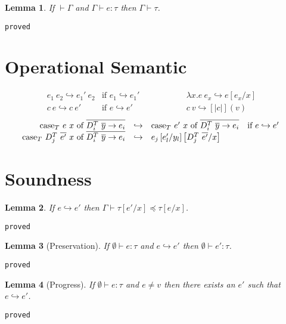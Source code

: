 \documentclass[10pt,a4paper]{article}
\newtheorem{lemma}{Lemma}
\newcommand\showproof[1]{\texttt{proved}}
\newcommand\dcti{\dct{i}}
\newcommand\dct[1]{\ensuremath{D^T_{#1}}}
\newcommand\efun[2]{\ensuremath{\lambda #1 . #2}}
\newcommand\eapp[2]{\ensuremath{#1 \ #2}}
\newcommand\edata[2]{\ensuremath{#1 \ #2}}
\newcommand\ecase[5]{\ensuremath{\text{case}_T\ #1\ #2\ \text{of}\ \overline{\edata{#3}{#4} \rightarrow #5}}}
\newcommand\sub[2]{\ensuremath{\left[ #2 / #1 \right]}}
\newcommand\eval[2]{\ensuremath{#1 \hookrightarrow #2}}
\newcommand\hastype[3]{\ensuremath{#1 \vdash #2 \colon #3}}
\newcommand\iswellformed[2]{\ensuremath{#1 \vdash #2}}
\newcommand\issubtype[3]{\ensuremath{#1 \vdash #2 \preceq #3}}
\begin{document}
\begin{lemma}\label{lemma:wellformed}
If \iswellformed{}{\Gamma} and \hastype{\Gamma}{e}{\tau} then \iswellformed{\Gamma}{\tau}.
\end{lemma}
\showproof{
	\begin{proof}
	
	\end{proof}
}

\section*{Operational Semantic}

$$
\begin{array}{lllll}
\eval{\eapp{e_1}{e_2}}{\eapp{e_1'}{e_2}} & \text{if } \eval{e_1}{e_1'}&\qquad\qquad&
\eval{\eapp{\efun{x}{e}}{e_x}}{e\sub{x}{e_x}} &\\
\eval{\eapp{c}{e}}{\eapp{c}{e'}} & \text{if } \eval{e}{e'} &\qquad\qquad&
\eval{\eapp{c}{v}}{[|c|](v)} &
\end{array}
$$
$$
\begin{array}{rllll}
\eval{\ecase{e}{x}{\dcti}{\overline{y}}{e_i}&}
	 {&\ecase{e'}{x}{\dcti}{\overline{y}}{e_i}} & \text{if } \eval{e}{e'} &\\
\eval	{\ecase{\eapp{\dct{j}}{\overline{e'}}}{x}{\dcti}{\overline{y}}{e_i}&}
		{&e_j\sub{y_l}{e'_l}\sub{x}{\eapp{\dct{j}}{\overline{e'}}}} &
\end{array}
$$

\section*{Soundness}
\begin{lemma}\label{lemma:eval}
If \eval{e}{e'} then \issubtype{\Gamma}{\tau\sub{x}{e'}}{\tau\sub{x}{e}}.
\end{lemma}
\showproof{
	\begin{proof}
	
	\end{proof}
}

\begin{lemma}[Preservation]\label{lemma:preservation}
If \hastype{\emptyset}{e}{\tau} and \eval{e}{e'} then \hastype{\emptyset}{e'}{\tau}.
\end{lemma}
\showproof{
	\begin{proof}
	
	\end{proof}
}
\begin{lemma}[Progress]\label{lemma:progress}
If \hastype{\emptyset}{e}{\tau} and $e \neq v$ then there exists an $e'$ such that \eval{e}{e'}.
\end{lemma}
\showproof{
	\begin{proof}
	
	\end{proof}
}
\end{document}
